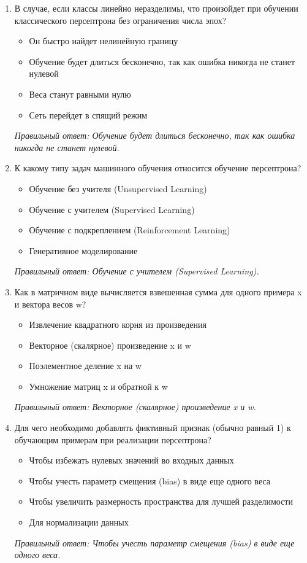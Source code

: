 \begin{enumerate}[label=\textbf{\arabic*.}, leftmargin=0pt, itemsep=1.2em]
\item В случае, если классы линейно неразделимы, что произойдет при обучении классического персептрона без ограничения числа эпох?
\begin{itemize}[label=$\square$, leftmargin=1.5cm, itemsep=0.2em, topsep=0.3em]
\item Он быстро найдет нелинейную границу
\item Обучение будет длиться бесконечно, так как ошибка никогда не станет нулевой
\item Веса станут равными нулю
\item Сеть перейдет в спящий режим
\end{itemize}
{\small\textit{Правильный ответ: Обучение будет длиться бесконечно, так как ошибка никогда не станет нулевой.}}

\item К какому типу задач машинного обучения относится обучение персептрона?
\begin{itemize}[label=$\square$, leftmargin=1.5cm, itemsep=0.2em, topsep=0.3em]
\item Обучение без учителя (Unsupervised Learning)
\item Обучение с учителем (Supervised Learning)
\item Обучение с подкреплением (Reinforcement Learning)
\item Генеративное моделирование
\end{itemize}
{\small\textit{Правильный ответ: Обучение с учителем (Supervised Learning).}}

\item Как в матричном виде вычисляется взвешенная сумма для одного примера x и вектора весов w?
\begin{itemize}[label=$\square$, leftmargin=1.5cm, itemsep=0.2em, topsep=0.3em]
\item Извлечение квадратного корня из произведения
\item Векторное (скалярное) произведение x и w
\item Поэлементное деление x на w
\item Умножение матриц x и обратной к w
\end{itemize}
{\small\textit{Правильный ответ: Векторное (скалярное) произведение x и w.}}

\item Для чего необходимо добавлять фиктивный признак (обычно равный 1) к обучающим примерам при реализации персептрона?
\begin{itemize}[label=$\square$, leftmargin=1.5cm, itemsep=0.2em, topsep=0.3em]
\item Чтобы избежать нулевых значений во входных данных
\item Чтобы учесть параметр смещения (bias) в виде еще одного веса
\item Чтобы увеличить размерность пространства для лучшей разделимости
\item Для нормализации данных
\end{itemize}
{\small\textit{Правильный ответ: Чтобы учесть параметр смещения (bias) в виде еще одного веса.}}


\end{enumerate}
